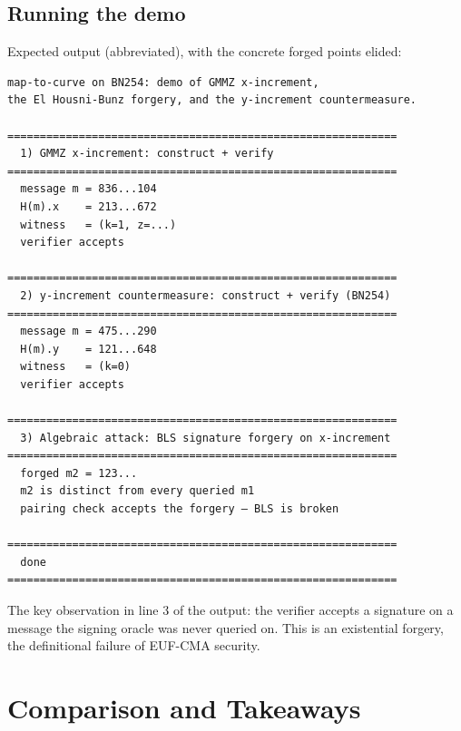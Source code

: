 \documentclass[11pt,a4paper]{article}
\theoremstyle{definition}
\begin{document}
\subsection*{Running the demo}

Expected output (abbreviated), with the concrete forged points elided:

\begin{Verbatim}[frame=single,fontsize=\small]
map-to-curve on BN254: demo of GMMZ x-increment,
the El Housni-Bunz forgery, and the y-increment countermeasure.

============================================================
  1) GMMZ x-increment: construct + verify
============================================================
  message m = 836...104
  H(m).x    = 213...672
  witness   = (k=1, z=...)
  verifier accepts

============================================================
  2) y-increment countermeasure: construct + verify (BN254)
============================================================
  message m = 475...290
  H(m).y    = 121...648
  witness   = (k=0)
  verifier accepts

============================================================
  3) Algebraic attack: BLS signature forgery on x-increment
============================================================
  forged m2 = 123...
  m2 is distinct from every queried m1
  pairing check accepts the forgery — BLS is broken

============================================================
  done
============================================================
\end{Verbatim}

The key observation in line 3 of the output: the verifier accepts a signature
on a message the signing oracle was never queried on. This is an existential
forgery, the definitional failure of EUF-CMA security.

\section{Comparison and Takeaways}
\end{document}

